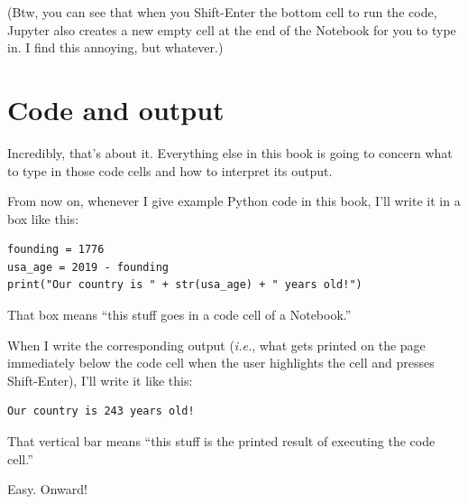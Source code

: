 (Btw, you can see that when you Shift-Enter the bottom cell to run the code,
Jupyter also creates a new empty cell at the end of the Notebook for you to
type in. I find this annoying, but whatever.)

\section{Code and output}

Incredibly, that's about it. Everything else in this book is going to concern
what to type in those code cells and how to interpret its output.

From now on, whenever I give example Python code in this book, I'll write it in
a box like this:

\begin{Verbatim}[fontsize=\small,samepage=true,frame=single,framesep=3mm]
founding = 1776
usa_age = 2019 - founding
print("Our country is " + str(usa_age) + " years old!")
\end{Verbatim}

That box means ``this stuff goes in a code cell of a Notebook.''

When I write the corresponding output (\textit{i.e.}, what gets printed on the
page immediately below the code cell when the user highlights the cell and
presses Shift-Enter), I'll write it like this:

\begin{Verbatim}[fontsize=\small,samepage=true,frame=leftline,framesep=5mm,framerule=1mm]
Our country is 243 years old!
\end{Verbatim}

That vertical bar means ``this stuff is the printed result of executing the
code cell.''

Easy. Onward!

